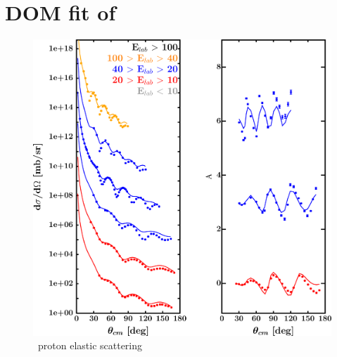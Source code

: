 \section{DOM fit of \snFour}
\label{sn124DOMOutput}
\begin{figure}[hbtp]
    \centering
    \begin{minipage}{0.47\textwidth}
        \centering
        \includegraphics[width=\textwidth]{figures/sn124_protonElastic.png}
        \caption*{\snFour\ proton elastic scattering}
        \label{DOMFitData_sn124_proton_elastic}
    \end{minipage}\hspace{6pt}
    \begin{minipage}{0.47\textwidth}
        \centering

\end{minipage}
\end{figure}

